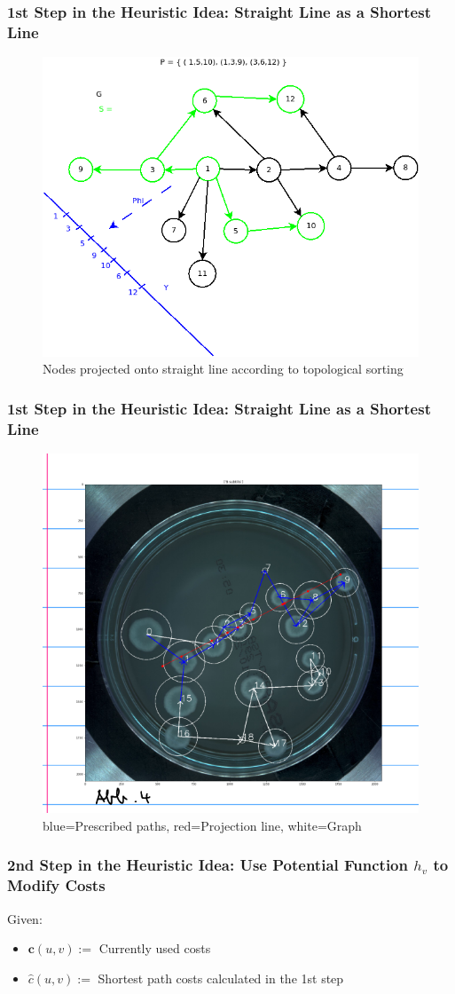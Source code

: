\documentclass[
	11pt, %
]{beamer}
\begin{document}
\begin{frame}
      \frametitle{1st Step in the Heuristic Idea: Straight Line as a Shortest Line}
	\begin{figure}
		\includegraphics[width=0.8\linewidth]{Figur03.png}
		\caption{Nodes projected onto straight line according to topological sorting}
	\end{figure}
\end{frame}


\begin{frame}
      \frametitle{1st Step in the Heuristic Idea: Straight Line as a Shortest Line}
	\begin{figure}
		\includegraphics[width=0.6\linewidth]{Figur04.png}
		\caption{blue=Prescribed paths, red=Projection line, white=Graph}
	\end{figure}
\end{frame}

\begin{frame}
      \frametitle{2nd Step in the Heuristic Idea: Use Potential Function $h_v$ to Modify Costs}
      Given: \\
\begin{itemize}
  \item $\mathbf{c}(u,v):=$ Currently used costs 
  \item $\hat{c}(u,v):=$ Shortest path costs calculated in the 1st step
\end{itemize}
\end{frame}
\end{document}

